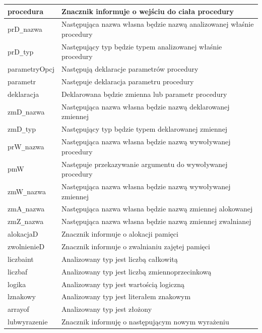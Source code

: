 \documentclass[a4paper,12pt]{article}
\begin{document}
\setlongtables
\begin{longtable}{|l|l|} %
  \hline 
  procedura & Znacznik informuje o wejściu do ciała procedury\\
  \hline
  prD\verb|_|nazwa & Następująca nazwa własna będzie nazwą analizowanej właśnie procedury\\
  \hline
  prD\verb|_|typ & Następujący typ będzie typem analizowanej właśnie procedury \\
  \hline
  parametryOpcj & Następują deklaracje parametrów procedury\\
  \hline
  parametr & Następuje deklaracja parametru procedury\\
  \hline
  deklaracja & Deklarowana będzie zmienna lub parametr procedury\\
  \hline
  zmD\verb|_|nazwa & Następująca nazwa własna będzie nazwą deklarowanej zmiennej\\
  \hline
  zmD\verb|_|typ & Następujący typ będzie typem deklarowanej zmiennej\\
  \hline
  prW\verb|_|nazwa & Następująca nazwa własna będzie nazwą wywoływanej procedury\\
  \hline
  pmW & Następuje przekazywanie argumentu do wywoływanej procedury\\
  \hline
  zmW\verb|_|nazwa & Następująca nazwa własna będzie nazwą wywoływanej zmiennej\\
  \hline
  zmA\verb|_|nazwa & Następująca nazwa własna będzie nazwą zmiennej alokowanej\\
  \hline
  zmZ\verb|_|nazwa & Następująca nazwa własna będzie nazwą zmiennej zwalnianej\\
  \hline
  alokacjaD & Znacznik informuje o alokacji pamięci\\
  \hline
  zwolnienieD & Znacznik informuje o zwalnianiu zajętej pamięci\\
  \hline
  liczbaint & Analizowany typ jest liczbą całkowitą\\
  \hline
  liczbaf & Analizowany typ jest liczbą zmiennoprzecinkową\\
  \hline
  logika & Analizowany typ jest wartością logiczną\\
  \hline
  lznakowy & Analizowany typ jest literałem znakowym\\
  \hline
  arrayof & Analizowany typ jest złożony\\
  \hline
  lubwyrazenie & Znacznik informuję o następującym nowym wyrażeniu\\

\end{longtable}
\end{document}
